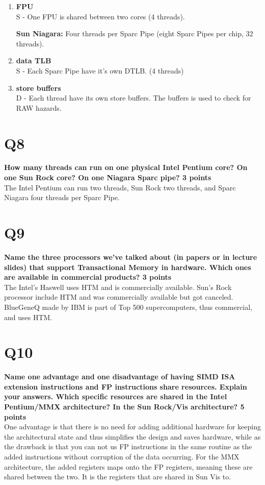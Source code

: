 \documentclass[a4paper]{article}
\begin{document}
\begin{enumerate}
\item
\textbf{FPU\\}
S - One FPU is shared between two cores (4 threads).

\textbf{Sun Niagara:} Four threads per Sparc Pipe (eight Sparc Pipes per chip, 32 threads).
\item
\textbf{data TLB\\}
S - Each Sparc Pipe have it's own DTLB. (4 threads)

\item
\textbf{store buffers\\}
D - Each thread have its own store buffers. The buffers is used to check for RAW hazards.

\end{enumerate}
\section*{Q8}
\large{\textbf{
How many threads can run on one physical Intel Pentium core? On one Sun Rock core? On one Niagara Sparc pipe? 3 points\\}}
The Intel Pentium can run two threads, Sun Rock two threads, and Sparc Niagara four threads per Sparc Pipe.

\section*{Q9}
\large{\textbf{
Name the three processors we’ve talked about (in papers or in lecture slides) that support Transactional Memory in hardware. Which ones are available in commercial products? 3 points\\}}
The Intel's Haswell uses HTM and is commercially available. Sun's Rock processor include HTM and was commercially available but got canceled. BlueGeneQ made by IBM is part of Top 500 supercomputers, thus commercial, and uses HTM.

\section*{Q10}
\large{\textbf{
Name one advantage and one disadvantage of having SIMD ISA extension instructions and FP instructions share resources. Explain your answers. Which specific resources are shared in the Intel Pentium/MMX architecture? In the Sun Rock/Vis architecture? 5 points\\}}
One advantage is that there is no need for adding additional hardware for keeping the architectural state and thus simplifies the design and saves hardware, while as the drawback is that you can not us FP instructions in the same routine as the added instructions without corruption of the data occurring. For the MMX architecture, the added registers maps onto the FP registers, meaning these are shared between the two. It is the registers that are shared in Sun Vis to.
\end{document}
